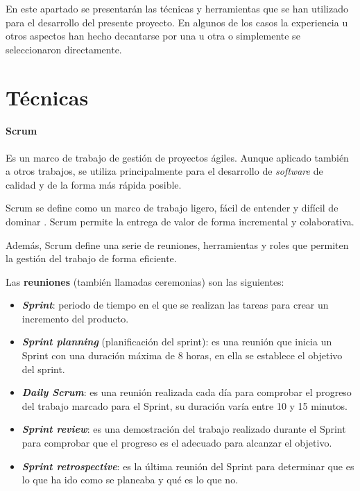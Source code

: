 
En este apartado se presentarán las técnicas y herramientas que se han utilizado
para el desarrollo del presente proyecto. En algunos de los casos la experiencia
u otros aspectos han hecho decantarse por una u otra o simplemente se
seleccionaron directamente.

\section{Técnicas}


\paragraph{Scrum} Es un marco de trabajo de gestión de proyectos ágiles. Aunque aplicado
también a otros trabajos, se utiliza principalmente para el desarrollo de
\textit{software} de calidad y de la forma más rápida posible.

Scrum se define como un marco de trabajo ligero, fácil de entender y difícil de
dominar \cite{scrum}. Scrum permite la entrega de valor de forma incremental y
colaborativa.

Además, Scrum define una serie de reuniones, herramientas y roles que permiten
la gestión del trabajo de forma eficiente.

Las \textbf{reuniones} (también llamadas ceremonias) son las siguientes:
\begin{itemize}
    \item \textbf{\textit{Sprint}}: periodo de tiempo en el que se realizan las tareas para crear
    un incremento del producto.
    \item \textbf{\textit{Sprint planning}} (planificación del sprint): es una reunión
    que inicia un Sprint con una duración máxima de 8 horas, en ella se
    establece el objetivo del sprint.
    \item \textbf{\textit{Daily Scrum}}: es una reunión realizada cada día para
    comprobar el progreso del trabajo marcado para el Sprint, su duración varía
    entre 10 y 15 minutos.
    \item \textbf{\textit{Sprint review}}: es una demostración del trabajo realizado
    durante el Sprint para comprobar que el progreso es el adecuado para
    alcanzar el objetivo.
    \item \textbf{\textit{Sprint retrospective}}: es la última reunión del Sprint para
    determinar que es lo que ha ido como se planeaba y qué es lo que no.
\end{itemize}

